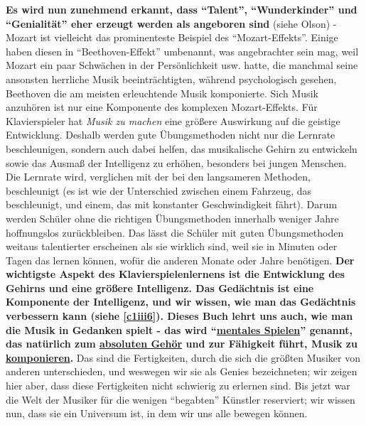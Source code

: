 \textbf{Es wird nun zunehmend erkannt, dass \enquote{Talent}, \enquote{Wunderkinder} und \enquote{Genialität} eher erzeugt werden als angeboren sind} (siehe Olson) - Mozart ist vielleicht das prominenteste Beispiel des \enquote{Mozart-Effekts}.
Einige haben diesen in \enquote{Beethoven-Effekt} umbenannt, was angebrachter sein mag, weil Mozart ein paar Schwächen in der Persönlichkeit usw. hatte, die manchmal seine ansonsten herrliche Musik beeinträchtigten, während psychologisch gesehen, Beethoven die am meisten erleuchtende Musik komponierte.
Sich Musik anzuhören ist nur eine Komponente des komplexen Mozart-Effekts.
Für Klavierspieler hat \textit{Musik zu machen} eine größere Auswirkung auf die geistige Entwicklung.
Deshalb werden gute Übungsmethoden nicht nur die Lernrate beschleunigen, sondern auch dabei helfen, das musikalische Gehirn zu entwickeln sowie das Ausmaß der Intelligenz zu erhöhen, besonders bei jungen Menschen.
Die Lernrate wird, verglichen mit der bei den langsameren Methoden, beschleunigt (es ist wie der Unterschied zwischen einem Fahrzeug, das beschleunigt, und einem, das mit konstanter Geschwindigkeit fährt).
Darum werden Schüler ohne die richtigen Übungsmethoden innerhalb weniger Jahre hoffnungslos zurückbleiben.
Das lässt die Schüler mit guten Übungsmethoden weitaus talentierter erscheinen als sie wirklich sind, weil sie in Minuten oder Tagen das lernen können, wofür die anderen Monate oder Jahre benötigen.
\textbf{Der wichtigste Aspekt des Klavierspielenlernens ist die Entwicklung des Gehirns und eine größere Intelligenz.
Das Gedächtnis ist eine Komponente der Intelligenz, und wir wissen, wie man das Gedächtnis verbessern kann (siehe \hyperref[c1iii6]{\autoref{c1iii6}}).
Dieses Buch lehrt uns auch, wie man die Musik in Gedanken spielt - das wird \enquote{\hyperref[c1ii12mental]{mentales Spielen}} genannt, das natürlich zum \hyperref[c1iii12]{absoluten Gehör} und zur Fähigkeit führt, Musik zu \hyperref[c1iii12blatt]{komponieren}.}
Das sind die Fertigkeiten, durch die sich die größten Musiker von anderen unterschieden, und weswegen wir sie als Genies bezeichneten; wir zeigen hier aber, dass diese Fertigkeiten nicht schwierig zu erlernen sind.
Bis jetzt war die Welt der Musiker für die wenigen \enquote{begabten} Künstler reserviert; wir wissen nun, dass sie ein Universum ist, in dem wir uns alle bewegen können.

